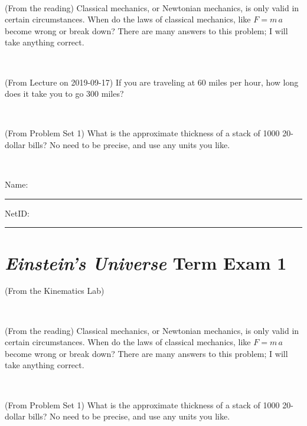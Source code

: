 \documentclass[12pt, letterpaper]{article}
\begin{document}
\vfill ~

\begin{problem} (From the reading)
Classical mechanics, or Newtonian mechanics, is only valid in certain
circumstances. When do the laws of classical mechanics, like $F =
m\,a$ become wrong or break down? There are many answers to this
problem; I will take anything correct.
\end{problem}


\vfill ~

\begin{problem} (From Lecture on 2019-09-17)
If you are traveling at 60 miles per hour, how long does
it take you to go 300 miles?
\end{problem}


\vfill ~

\begin{problem} (From Problem Set 1)
What is the approximate thickness of a stack of 1000 20-dollar bills?
No need to be precise, and use any units you like.
\end{problem}


\vfill ~


\cleardoublepage



\noindent
Name: \rule[-1ex]{0.60\textwidth}{0.1pt}
NetID: \rule[-1ex]{0.20\textwidth}{0.1pt}

\section*{\textsl{Einstein's Universe} Term Exam 1}
\setcounter{problem}{1}


\begin{problem} (From the Kinematics Lab)

\end{problem}


\vfill ~

\begin{problem} (From the reading)
Classical mechanics, or Newtonian mechanics, is only valid in certain
circumstances. When do the laws of classical mechanics, like $F =
m\,a$ become wrong or break down? There are many answers to this
problem; I will take anything correct.
\end{problem}


\vfill ~

\begin{problem} (From Problem Set 1)
What is the approximate thickness of a stack of 1000 20-dollar bills?
No need to be precise, and use any units you like.
\end{problem}
\end{document}
